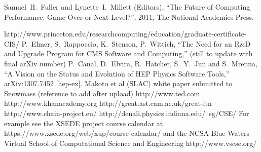 \begin{thebibliography}{99}



 Samuel~H.~Fuller and Lynette~I.~Millett (Editors),
  ``The Future of Computing Performance:  Game Over or Next Level?'', 
  2011,
  The National Academies Press.

 http://www.princeton.edu/researchcomputing/education/graduate-certificate-CIS/
 P.~Elmer, S.~Rappoccio, K.~Stenson, P.~Wittich, 
  ``The Need for an R\&D and Upgrade Program for CMS Software and Computing,'' 
   (still to update with final arXiv number)
  P.~Canal, D.~Elvira, R.~Hatcher, S.~Y.~Jun and S.~Mrenna,
  ``A Vision on the Status and Evolution of HEP Physics Software Tools,''
  arXiv:1307.7452 [hep-ex].
 Makoto et al (SLAC) white paper submitted to Snowmass (reference to add after upload)
 http://www.ted.com
 http://www.khanacademy.org
 http://great.ast.cam.ac.uk/great-itn
 http://www.chain-project.eu/
 http://denali.physics.indiana.edu/~sg/CSE/ 
 For example see the XSEDE project course calendar at https://www.xsede.org/web/xup/course-calendar/ and the NCSA Blue Waters Virtual School of Computational Science and Engineering http://www.vscse.org/ 


\end{thebibliography}
















